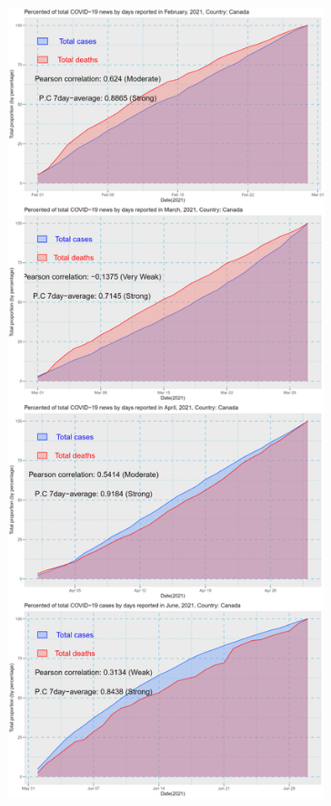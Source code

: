 \documentclass[a4paper]{article}
\theoremstyle{definition}
\begin{document}
\begin{enumerate}[i)]
\begin{enumerate}[1)]
\begin{figure}[H]
			\end{figure}
			\begin{figure}[H]
				\centering
				\includegraphics[height=23cm,width=13cm]{images/9.2.png}
			\end{figure}
			\begin{figure}[H]
				\centering

\end{figure}
\end{enumerate}
\end{enumerate}
\end{document}
